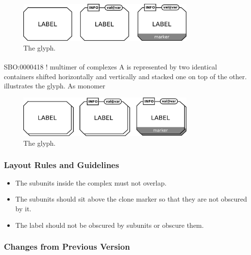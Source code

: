 \begin{figure}[H]
  \centering
  \includegraphics[width=3.5in]{images/complexGlyph}
  \caption{The  glyph.}
  \label{fig:complex}
\end{figure}


\paragraph{}

 \begin{glyphDescription}
\glyphSboTerm SBO:0000418 ! multimer of complexes
\glyphContainer A  is represented by two
identical  containers shifted horizontally and
vertically and stacked one on top of the other.  
illustrates the glyph.
\glyphLabel As monomer
\end{glyphDescription}

\begin{figure}[H]
  \centering
  \includegraphics[width = 3.5in]{images/complexMultimerGlyph}
  \caption{The  glyph.}
  \label{fig:complexMultimer}
\end{figure}

\subsubsection{Layout Rules and Guidelines}

\begin{itemize}
\item The subunits inside the complex must not overlap.
\item The subunits should sit above the clone marker so that they are
  not obscured by it.
\item The label should not be obscured by subunits or obscure them.
\end{itemize}


\subsubsection{Changes from Previous Version}

